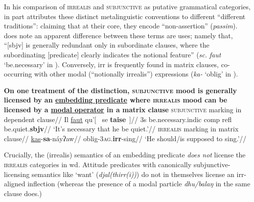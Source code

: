  In his comparison of \textsc{irrealis} and \textsc{subjunctive} as putative grammatical categories, \citet[185]{Palmer2001} in part attributes these distinct metalinguistic conventions to different ``different traditions'': claiming that at their core, they encode ``non-assertion'' (\textit{passim}). \citet{Palmer2001} does note an apparent difference between these terms are uses; namely that, ``[\gls{sbjv}] is generally redundant only in subordinate clauses, where the subordinating [predicate] clearly indicates the notional feature'' (\textit{sc.} \textit{faut} `be.necessary' in ). Conversely, \gls{irr} is frequently found in matrix clauses, co-occurring with other modal (``notionally irrealis'') expressions (\textit{ka-} `\gls{oblig}' in ).

\pex{} \textbf{On one treatment of the distinction, \textsc{subjunctive} mood is generally licensed by an \ul{embedding predicate} where \textsc{irrealis} mood can be licensed by a \ul{modal operator} in a matrix clause}
\a\begingl\glpreamble{}\textsc{subjunctive} marking in dependent clause//
\gla Il \ul{faut} qu'\textup{[}~ se \textbf{taise}~\textup{]}//
\glb 3s be.necessary.\gls{indic} \gls{comp} \gls{refl} be.quiet.\textbf{\gls{sbjv}}//
\glft`It's necessary that he be quiet.'//\endgl
\a\begingl\glpreamble {}  \textsc{irrealis} marking in matrix clause//
\gla \ul{kas}-\textbf{sa}-náyʔaw//
\glb \gls{oblig}-3\textsc{ag}.\textbf{\gls{irr}}-sing//
\glft`He should/is supposed to sing.'//\endgl
\xe


Crucially, the (irrealis) semantics of an embedding predicate \textit{does not} license the \textsc{irrealis} categories in \gls{wd}. Attitude predicates with canonically subjunctive-licensing semantics like `want' (\textit{djal(thirr(i))}) do not in themselves license an \gls{irr}-aligned inflection (whereas the presence of a modal particle \textit{dhu/balaŋ} in the same clause does.)

